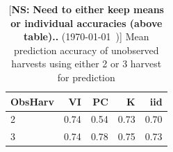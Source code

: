 \documentclass[12pt, letterpaper]{article}
\newcommand{\nicholas}[1]{{\color{nicholasCol} [\textbf{NS:} #1 (\today\ \currenttime)]}}
\begin{document}
\begin{table}[ht]
\caption{\nicholas{\textbf{Need to either keep means or individual accuracies (above table)..}} Mean prediction accuracy of unobserved harvests using either 2 or 3 harvest for prediction}
\centering
\begin{tabular*}{\hsize}{@{\extracolsep{\fill}}lrrrr}
  \hline
 ObsHarv & VI & PC & K & iid \\ 
  \hline
  2 & 0.74 & 0.54 & 0.73 & 0.70 \\ 
  3 & 0.74 & 0.78 & 0.75 & 0.73 \\ 
   \hline
\end{tabular*}
\end{table}

\end{document}

